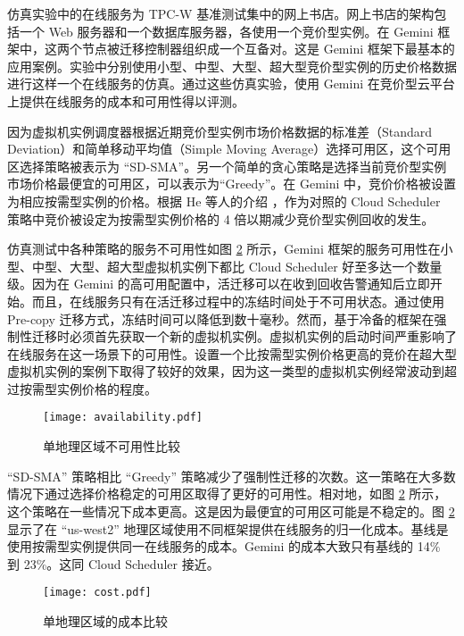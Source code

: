 仿真实验中的在线服务为 TPC-W 基准测试集中的网上书店。网上书店的架构包括一个 Web 服务器和一个数据库服务器，各使用一个竞价型实例。在 Gemini 框架中，这两个节点被迁移控制器组织成一个互备对。这是 Gemini 框架下最基本的应用案例。实验中分别使用小型、中型、大型、超大型竞价型实例的历史价格数据进行这样一个在线服务的仿真。通过这些仿真实验，使用 Gemini 在竞价型云平台上提供在线服务的成本和可用性得以评测。

因为虚拟机实例调度器根据近期竞价型实例市场价格数据的标准差（Standard Deviation）和简单移动平均值（Simple Moving Average）选择可用区，这个可用区选择策略被表示为 ``SD-SMA''。另一个简单的贪心策略是选择当前竞价型实例市场价格最便宜的可用区，可以表示为``Greedy''。在 Gemini 中，竞价价格被设置为相应按需型实例的价格。根据 He 等人的介绍 \cite{He:2015:CCH:2749246.2749275}，作为对照的 Cloud Scheduler 策略中竞价被设定为按需型实例价格的 4 倍以期减少竞价型实例回收的发生。

仿真测试中各种策略的服务不可用性如图 \ref{figure:cost} 所示，Gemini 框架的服务可用性在小型、中型、大型、超大型虚拟机实例下都比 Cloud Scheduler 好至多达一个数量级。因为在 Gemini 的高可用配置中，活迁移可以在收到回收告警通知后立即开始。而且，在线服务只有在活迁移过程中的冻结时间处于不可用状态。通过使用 Pre-copy 迁移方式，冻结时间可以降低到数十毫秒。然而，基于冷备的框架在强制性迁移时必须首先获取一个新的虚拟机实例。虚拟机实例的启动时间严重影响了在线服务在这一场景下的可用性。设置一个比按需型实例价格更高的竞价在超大型虚拟机实例的案例下取得了较好的效果，因为这一类型的虚拟机实例经常波动到超过按需型实例价格的程度。
\begin{figure}[]
  \centering
  \texttt{[image: availability.pdf]}
  \caption{单地理区域不可用性比较}
  \label{figure:unavailability}
\end{figure}

``SD-SMA'' 策略相比 ``Greedy'' 策略减少了强制性迁移的次数。这一策略在大多数情况下通过选择价格稳定的可用区取得了更好的可用性。相对地，如图 \ref{figure:cost} 所示，这个策略在一些情况下成本更高。这是因为最便宜的可用区可能是不稳定的。图 \ref{figure:cost} 显示了在 ``us-west2'' 地理区域使用不同框架提供在线服务的归一化成本。基线是使用按需型实例提供同一在线服务的成本。Gemini 的成本大致只有基线的 14\% 到 23\%。这同 Cloud Scheduler 接近。
\begin{figure}[]
  \centering
  \texttt{[image: cost.pdf]}
  \caption{单地理区域的成本比较}
  \label{figure:cost}
\end{figure}

